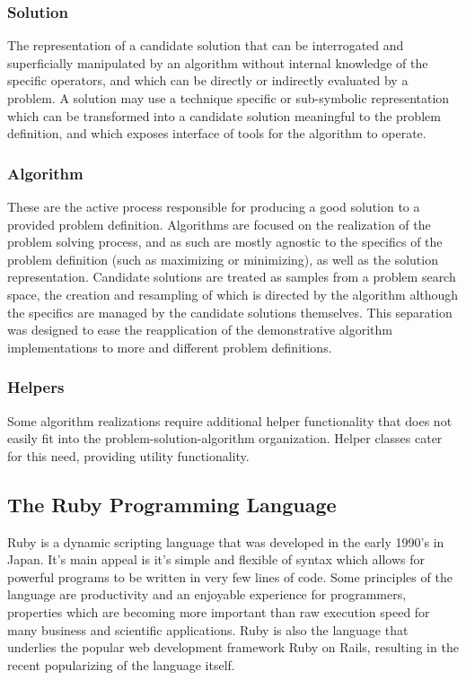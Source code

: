 \subsubsection{Solution} The representation of a candidate solution that can be interrogated and superficially manipulated  by an algorithm without internal knowledge of the specific operators, and which can be directly or indirectly evaluated by a problem. A solution may use a technique specific or sub-symbolic representation which can be transformed into a candidate solution meaningful to the problem definition, and which exposes interface of tools for the algorithm to operate.
\subsubsection{Algorithm} These are the active process responsible for producing a good solution to a provided problem definition. Algorithms are focused on the realization of the problem solving process, and as such are mostly agnostic to the specifics of the problem definition (such as maximizing or minimizing), as well as the solution representation. Candidate solutions are treated as samples from a problem search space, the creation and resampling of which is directed by the algorithm although the specifics are managed by the candidate solutions themselves. This separation was designed to ease the reapplication of the demonstrative algorithm implementations to more and different problem definitions.
\subsubsection{Helpers} Some algorithm realizations require additional helper functionality that does not easily fit into the problem-solution-algorithm organization. Helper classes cater for this need, providing utility functionality.

\subsection{The Ruby Programming Language}
Ruby is a dynamic scripting language that was developed in the early 1990's in Japan. It's main appeal is it's simple and flexible of syntax which allows for powerful programs to be written in very few lines of code. Some principles of the language are productivity and an enjoyable experience for programmers, properties which are becoming more important than raw execution speed for many business and scientific applications. Ruby is also the language that underlies the popular web development framework Ruby on Rails, resulting in the recent popularizing of the language itself.

